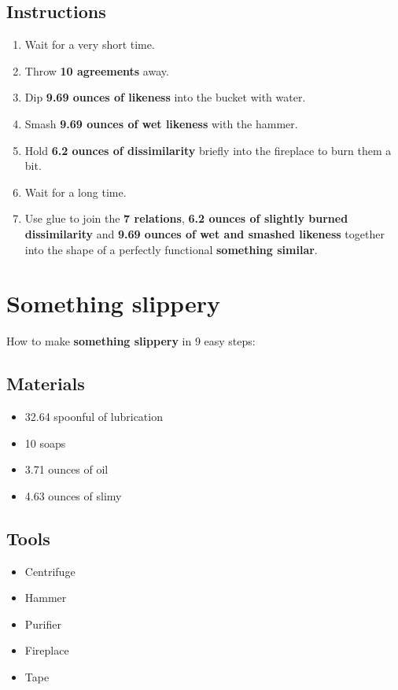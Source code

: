 \documentclass{article}
\begin{document}
\subsection{Instructions}\begin{enumerate}
\item 
Wait for a very short time.
\item 
Throw \textbf{10 agreements} away.
\item 
Dip \textbf{9.69 ounces of likeness} into the bucket with water.
\item 
Smash \textbf{9.69 ounces of wet likeness} with the hammer.
\item 
Hold \textbf{6.2 ounces of dissimilarity} briefly into the fireplace to burn them a bit.
\item 
Wait for a long time.
\item 
Use glue to join the \textbf{7 relations}, \textbf{6.2 ounces of slightly burned dissimilarity} and \textbf{9.69 ounces of wet and smashed likeness} together into the shape of a perfectly functional \textbf{something similar}.
\end{enumerate}
\newpage
\section{Something slippery}How to make \textbf{something slippery} in 9 easy steps:

\subsection{Materials}\begin{itemize}
\item 
32.64 spoonful of lubrication
\item 
10 soaps
\item 
3.71 ounces of oil
\item 
4.63 ounces of slimy
\end{itemize}
\subsection{Tools}\begin{itemize}
\item 
Centrifuge
\item 
Hammer
\item 
Purifier
\item 
Fireplace
\item 
Tape
\end{itemize}
\end{document}
